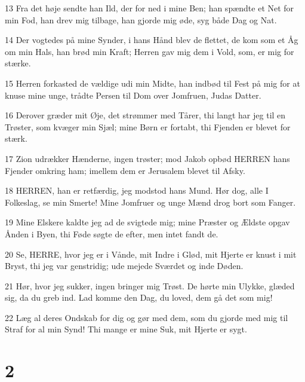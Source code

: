 \par 13 Fra det høje sendte han Ild, der for ned i mine Ben; han spændte et Net for min Fod, han drev mig tilbage, han gjorde mig øde, syg både Dag og Nat.
\par 14 Der vogtedes på mine Synder, i hans Hånd blev de flettet, de kom som et Åg om min Hals, han brød min Kraft; Herren gav mig dem i Vold, som, er mig for stærke.
\par 15 Herren forkasted de vældige udi min Midte, han indbød til Fest på mig for at knuse mine unge, trådte Persen til Dom over Jomfruen, Judas Datter.
\par 16 Derover græder mit Øje, det strømmer med Tårer, thi langt har jeg til en Trøster, som kvæger min Sjæl; mine Børn er fortabt, thi Fjenden er blevet for stærk.
\par 17 Zion udrækker Hænderne, ingen trøster; mod Jakob opbød HERREN hans Fjender omkring ham; imellem dem er Jerusalem blevet til Afsky.
\par 18 HERREN, han er retfærdig, jeg modstod hans Mund. Hør dog, alle I Folkeslag, se min Smerte! Mine Jomfruer og unge Mænd drog bort som Fanger.
\par 19 Mine Elskere kaldte jeg ad de svigtede mig; mine Præster og Ældste opgav Ånden i Byen, thi Føde søgte de efter, men intet fandt de.
\par 20 Se, HERRE, hvor jeg er i Vånde, mit Indre i Glød, mit Hjerte er knust i mit Bryst, thi jeg var genstridig; ude mejede Sværdet og inde Døden.
\par 21 Hør, hvor jeg sukker, ingen bringer mig Trøst. De hørte min Ulykke, glæded sig, da du greb ind. Lad komme den Dag, du loved, dem gå det som mig!
\par 22 Læg al deres Ondskab for dig og gør med dem, som du gjorde med mig til Straf for al min Synd! Thi mange er mine Suk, mit Hjerte er sygt.

\chapter{2}

